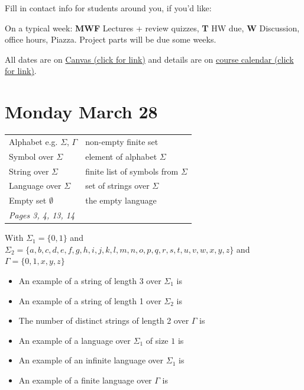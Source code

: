 \documentclass[12pt, oneside]{article}
\begin{document}
Fill in contact info for students around you, if you'd like:
\vspace{50pt}


On a typical week: {\bf MWF} Lectures + review quizzes, {\bf T} HW due, {\bf W} Discussion, office hours, Piazza. 
Project parts will be due some weeks.

All dates are on \href{https://canvas.ucsd.edu/}{Canvas (click for link)} and details are on
 \href{https://theory-cs.github.io/website/overview_calendar.html}{course calendar (click for link)}.


\newpage
\section*{Monday March 28}



\begin{center}
    \begin{tabular}{|ll|}
    \hline
    Alphabet e.g. $\Sigma$, $\Gamma$ & 	non-empty finite set	 \\
    Symbol over $\Sigma$  & element of alphabet $\Sigma$\\
    String over $\Sigma$  &	finite list of symbols from $\Sigma$\\
    Language over $\Sigma$& set of strings over $\Sigma$ \\
    Empty set $\emptyset$ & the empty language\\
    \hline
    {\it Pages 3, 4, 13, 14 }& \\
    \hline
    \end{tabular}
    \end{center}
    
    With $\Sigma_1 = \{0,1\}$ and $\Sigma_2 = \{a,b,c,d,e,f,g,h,i,j,k,l,m,n,o,p,q,r,s,t,u,v,w,x,y,z\}$  and $\Gamma = \{0,1,x,y,z\}$
    
    \begin{itemize}
    \setlength{\itemsep}{10pt}
    \item[] An example of a string of length 3 over $\Sigma_1$ is 
    \item[] An example of  a string of length 1 over $\Sigma_2$ is 
    \item[] The number of distinct strings of length 2 over $\Gamma$ is
    \item[] An example of a language over $\Sigma_1$ of size $1$ is
    \item[] An example of an infinite language over $\Sigma_1$ is
    \item[] An example of  a finite language over $\Gamma$ is
    
    \end{itemize}
    
\end{document}
